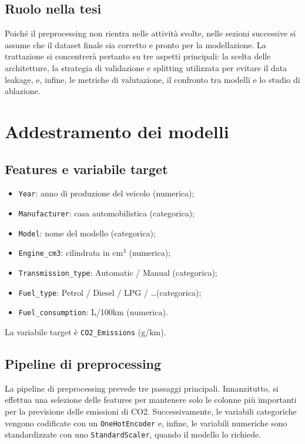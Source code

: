 \documentclass[a4paper,12pt]{report}
\begin{document}
	\subsection{Ruolo nella tesi}
	Poiché il preprocessing non rientra nelle attività svolte, nelle sezioni successive si assume che il dataset finale sia corretto e pronto per la modellazione. La trattazione si concentrerà pertanto su tre aspetti principali: la scelta delle architetture, la strategia di validazione e splitting utilizzata per evitare il data leakage, e, infine, le metriche di valutazione, il confronto tra modelli e lo studio di ablazione.
	
	\section{Addestramento dei modelli}
	
	\subsection{Features e variabile target}
	\begin{itemize}
		\item \texttt{Year}: anno di produzione del veicolo (numerica);
		\item \texttt{Manufacturer}: casa automobilistica (categorica);
		\item \texttt{Model}: nome del modello (categorica);
		\item \texttt{Engine\_cm3}: cilindrata in \(\mathrm{cm^3}\) (numerica);
		\item \texttt{Transmission\_type}: Automatic / Manual (categorica);
		\item \texttt{Fuel\_type}: Petrol / Diesel / LPG / \ldots (categorica);
		\item \texttt{Fuel\_consumption}: L/100km (numerica).
	\end{itemize}
	La variabile target è \texttt{CO2\_Emissions} (g/km).
	
	\subsection{Pipeline di preprocessing}
	La pipeline di preprocessing prevede tre passaggi principali. Innanzitutto, si effettua una selezione delle features per mantenere solo le colonne più importanti per la previsione delle emissioni di CO2. Successivamente, le variabili categoriche vengono codificate con un \texttt{OneHotEncoder} e, infine, le variabili numeriche sono standardizzate con uno \texttt{StandardScaler}, quando il modello lo richiede.
	
\end{document}
